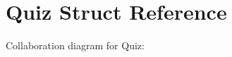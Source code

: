 \hypertarget{structQuiz}{}\section{Quiz Struct Reference}
\label{structQuiz}


Collaboration diagram for Quiz\+:
